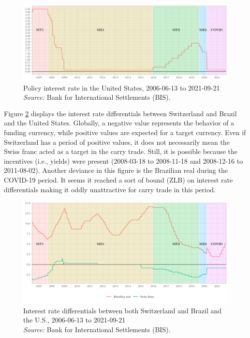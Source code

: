 \documentclass[a4paper, twoside]{templates/ociamthesis}
\begin{document}
\begin{figure}[!ht]

{\centering \includegraphics[width=0.99\columnwidth]{figure/USMONPOL} 

}

\caption[Policy interest rate in the U.S., 2006-06-13 to 2021-09-21]{Policy interest rate in the United States, 2006-06-13 to 2021-09-21 \\ \scriptsize \textit{Source:} Bank for International Settlements (BIS).}\label{fig:Figure30}
\end{figure}

Figure \ref{fig:Figure311} displays the interest rate differentials between Switzerland and Brazil and the United States. Globally, a negative value represents the behavior of a funding currency, while positive values are expected for a target currency. Even if Switzerland has a period of positive values, it does not necessarily mean the Swiss franc acted as a target in the carry trade. Still, it is possible because the incentives (i.e., yields) were present (2008-03-18 to 2008-11-18 and 2008-12-16 to 2011-08-02). Another deviance in this figure is the Brazilian real during the COVID-19 period. It seems it reached a sort of bound (ZLB) on interest rate differentials making it oddly unattractive for carry trade in this period.

\begin{figure}[!ht]

{\centering \includegraphics[width=0.99\columnwidth]{figure/CHFBRLIRD} 

}

\caption[Interest rate differentials between both Switzerland and Brazil and the United States, 2006-06-13 to 2021-09-21]{Interest rate differentials between both Switzerland and Brazil and the U.S., 2006-06-13 to 2021-09-21 \\ \scriptsize \textit{Source:} Bank for International Settlements (BIS).}\label{fig:Figure311}
\end{figure}
\end{document}

